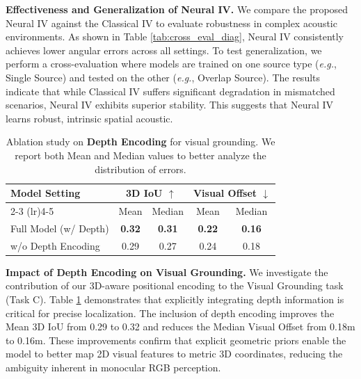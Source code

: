 \textbf{Effectiveness and Generalization of Neural IV.}
We compare the proposed {Neural IV}  against the {Classical IV} to evaluate robustness in complex acoustic environments. As shown in Table \ref{tab:cross_eval_diag}, Neural IV consistently achieves lower angular errors across all settings.
To test generalization, we perform a cross-evaluation where models are trained on one source type (\textit{e.g.}, Single Source) and tested on the other (\textit{e.g.}, Overlap Source).
The results indicate that while Classical IV suffers significant degradation in mismatched scenarios, Neural IV exhibits superior stability. This suggests that Neural IV learns robust, intrinsic spatial acoustic.

\begin{table}[t]
    \centering
    \setlength{\tabcolsep}{3pt}
    \caption{Ablation study on \textbf{Depth Encoding} for visual grounding. We report both Mean and Median values to better analyze the distribution of errors.}
    \vspace{0.1in}
    
    \begin{tabular}{l cc cc}
    \toprule
    \multirow{2}{*}{\textbf{Model Setting}} & \multicolumn{2}{c}{\textbf{3D IoU} $\uparrow$} & \multicolumn{2}{c}{\textbf{Visual Offset} $\downarrow$} \\
    \cmidrule(lr){2-3} \cmidrule(lr){4-5}
    & Mean & Median & Mean & Median \\
    \midrule
    
    Full Model (w/ Depth) & \textbf{0.32} & \textbf{0.31} & \textbf{0.22} & \textbf{0.16} \\
    
    w/o Depth Encoding    & 0.29 & 0.27 & 0.24 & 0.18 \\
    
    \bottomrule
    \end{tabular}
    \label{tab:ablation_visual}
\end{table}

\textbf{Impact of Depth Encoding on Visual Grounding.}
We investigate the contribution of our 3D-aware positional encoding to the Visual Grounding task (Task C). Table \ref{tab:ablation_visual} demonstrates that explicitly integrating depth information is critical for precise localization. The inclusion of depth encoding improves the Mean 3D IoU from 0.29 to 0.32 and reduces the Median Visual Offset from 0.18m to 0.16m. These improvements confirm that explicit geometric priors enable the model to better map 2D visual features to metric 3D coordinates, reducing the ambiguity inherent in monocular RGB perception.

